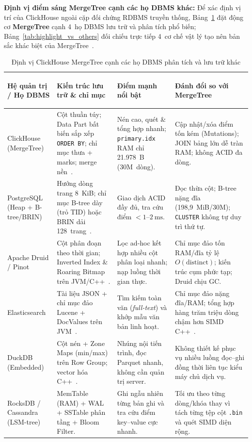 \documentclass[13pt,a4paper]{report}
\begin{document}
\vspace{0.2cm}
\noindent\textbf{Định vị điểm sáng MergeTree cạnh các họ DBMS khác:} Để xác định vị trí của ClickHouse ngoài cặp đối chứng RDBMS truyền thống, Bảng~\ref{tab:dbms_positioning} đặt động cơ \textbf{MergeTree} cạnh 4~họ DBMS lưu trữ và phân tích phổ biến; Bảng~\ref{tab:highlight_vs_others} đối chiếu trực tiếp 4~cơ chế vật lý tạo nên bản sắc khác biệt của MergeTree~\cite{A1, B2}.

\begin{table}[!htb]
\centering
\footnotesize
\renewcommand{\arraystretch}{1.14}
\caption{Định vị ClickHouse MergeTree cạnh các họ DBMS phân tích và lưu trữ khác}
\label{tab:dbms_positioning}
\begin{tabularx}{\textwidth}{>{\bfseries\raggedright\arraybackslash}p{2.65cm} >{\raggedright\arraybackslash}p{3.95cm} >{\raggedright\arraybackslash}p{3.75cm} >{\raggedright\arraybackslash}X}
\toprule
\textbf{Hệ quản trị / Họ DBMS} & \textbf{Kiến trúc lưu trữ \& chỉ mục} & \textbf{Điểm mạnh nổi bật} & \textbf{Đánh đổi so với MergeTree} \\
\midrule
ClickHouse (MergeTree) & Cột thuần túy; Data Part bất biến sắp xếp \texttt{ORDER BY}; chỉ mục thưa + marks; merge nền~\cite{A1, S2, S3}. & Nén cao, quét \& tổng hợp nhanh; \texttt{primary.idx} RAM chỉ 21.978~B (30M~dòng). & Cập nhật/xóa điểm tốn kém (Mutations); JOIN bảng lớn dễ tràn RAM; không ACID đa dòng. \\
\addlinespace[3pt]
PostgreSQL (Heap + B-tree/BRIN) & Hướng dòng trang 8~KiB; chỉ mục B-tree dày (trỏ TID) hoặc BRIN dải 128~trang~\cite{P1, P2, P3}. & Giao dịch ACID đầy đủ, tra cứu điểm $< 1\text{--}2~\text{ms}$. & Đọc thừa cột; B-tree nặng đĩa (198,9~MiB/30M); \texttt{CLUSTER} không tự duy trì thứ tự. \\
\addlinespace[3pt]
Apache Druid / Pinot & Cột phân đoạn theo thời gian; Inverted Index \& Roaring Bitmap trên JVM/C++~\cite{A1}. & Lọc ad-hoc kết hợp nhiều cột phân loại nhanh; nạp luồng thời gian thực. & Chỉ mục đảo tốn RAM/đĩa tỷ lệ $O(\text{distinct})$; kiến trúc cụm phức tạp; Druid chịu GC. \\
\addlinespace[3pt]
Elasticsearch & Tài liệu JSON + chỉ mục đảo Lucene + DocValues trên JVM~\cite{B2}. & Tìm kiếm toàn văn (\textit{full-text}) và khớp mẫu văn bản linh hoạt. & Chỉ mục đảo nặng đĩa/RAM; tổng hợp hàng trăm triệu dòng chậm hơn SIMD C++~\cite{B2}. \\
\addlinespace[3pt]
DuckDB (Embedded) & Cột nén + Zone Maps (min/max) trên Row Group; vector hóa C++~\cite{A1}. & Nhúng nội tiến trình, đọc Parquet nhanh, không cần quản trị server. & Không thiết kế phục vụ nhiều luồng đọc--ghi đồng thời liên tục kiểu máy chủ dịch vụ. \\
\addlinespace[3pt]
RocksDB / Cassandra (LSM-tree) & MemTable (RAM) + WAL + SSTable phân tầng + Bloom Filter. & Ghi ngẫu nhiên từng bản ghi và tra cứu điểm key--value cực nhanh. & Tối ưu theo từng dòng/khóa thay vì tách từng tệp cột \texttt{.bin} và quét SIMD diện rộng. \\
\bottomrule
\end{tabularx}
\end{table}
\end{document}
